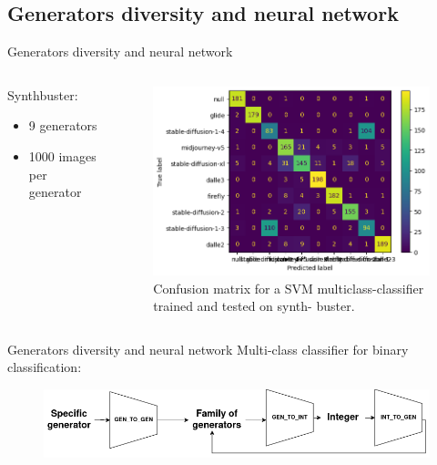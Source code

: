 \documentclass[11pt,compress]{beamer} %
\begin{document}
\subsection{Generators diversity and neural network}
\begin{frame}{Generators diversity and neural network}
  \begin{columns}
    \begin{column}{.4\textwidth}
      Synthbuster:
      \begin{itemize}
        \item 9 generators
        \item 1000 images per generator
      \end{itemize}
    \end{column}

    \begin{column}{.6\textwidth}
      \begin{figure}
        \includegraphics[width=\textwidth]{img/confusion.png}
        \caption{Confusion matrix for a SVM multiclass-classifier trained and tested on synth-
        buster.}
      \end{figure}
    \end{column}
  \end{columns}
\end{frame}

\begin{frame}{Generators diversity and neural network}
  Multi-class classifier for binary classification:
  \begin{figure}
    \includegraphics[width=\textwidth]{img/maps.png}
  \end{figure}
\end{frame}
\end{document}
